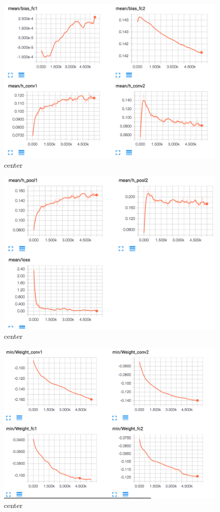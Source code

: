 \documentclass[12pt]{article}
\begin{document}
\begin{figure}[H]
  \caption{center}
  \centering
    \includegraphics[scale=0.3]{beam3.png}
\end{figure}
\begin{figure}[H]
  \caption{center}
  \centering
    \includegraphics[scale=0.3]{bmean4.png}
\end{figure}
\begin{figure}[H]
  \caption{center}
  \centering
    \includegraphics[scale=0.3]{bmin1.png}
\end{figure}
\end{document}
